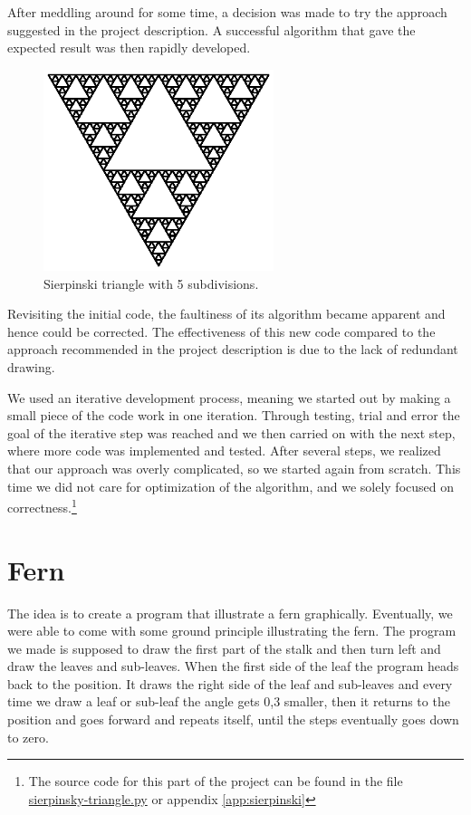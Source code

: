 \documentclass[titlepage]{article}
\begin{document}
After meddling around for some time, a decision was made to try the approach suggested in the project description. A successful algorithm that gave the expected result was then rapidly developed.
\begin{figure}[H]
  
  \includegraphics[width=0.6\textwidth]{triangle}
  \caption{Sierpinski triangle with 5 subdivisions.}
\end{figure}
Revisiting the initial code, the faultiness of its algorithm became apparent and hence could be corrected. The effectiveness of this new code compared to the approach recommended in the project description is due to the lack of redundant drawing. \par We used an iterative development process, meaning we started out by making a small piece of the code work in one iteration. Through testing, trial and error the goal of the iterative step was reached and we then carried on with the next step, where more code was implemented and tested. After several steps, we realized that our approach was overly complicated, so we started again from scratch. This time we did not care for optimization of the algorithm, and we solely focused on correctness.\footnote{The source code for this part of the project can be found in the file \href{https://github.com/ErikAndersen81/DM550-FractalProject/blob/master/sierpinsky-triangle.py}{sierpinsky-triangle.py} or appendix \ref{app:sierpinski}}

\section{Fern}
The idea is to create a program that illustrate a fern graphically. Eventually, we were able to come with some ground principle illustrating the fern. The program we made is supposed to draw the first part of the stalk and then turn left and draw the leaves and sub-leaves. When the first side of the leaf the program heads back to the position. It draws the right side of the leaf and sub-leaves and every time we draw a leaf or sub-leaf the angle gets 0,3 smaller, then it returns to the position and goes forward and repeats itself, until the steps eventually goes down to zero.
\end{document}
